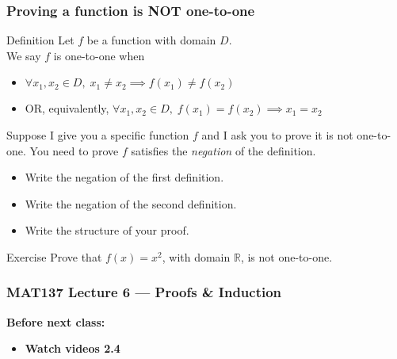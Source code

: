 \documentclass[14pt]{beamer}
\newcommand {\DS} [1] {${\displaystyle #1}$}
\newcommand {\R}{\mathbb{R}}
\newcommand{\p}{\pause}
\begin{document}
\begin{frame}[t]
\fontsize{13}{13}\selectfont
\frametitle{Proving a function is NOT one-to-one}

\begin{block}{Definition}
Let $f$ be a function with domain $D$. \\
We say $f$ is one-to-one when 
	\begin{itemize} 
		\item   \hfill \DS{\forall x_1, x_2 \in D, \; x_1 \neq x_2 \implies  f(x_1) \neq f(x_2)}
		\item    OR, equivalently, \hfill  \DS{\forall x_1, x_2 \in D, \; f(x_1) = f(x_2) \implies x_1 = x_2}
	\end{itemize}
\end{block}

\vfill  \p

Suppose I give you a specific function $f$ and I ask you to prove it is not one-to-one. \pause  You need to prove $f$ satisfies the \emph{negation} of the definition.
	\begin{itemize}
		\item  Write the negation of the first definition.
		\item  Write the negation of the second definition.
		\item  Write the structure of your proof. 
	\end{itemize}
	
\vfill	 \p

\begin{block}{Exercise}
	Prove that $f(x) =  x^2$, with domain $\R$, is not one-to-one.
\end{block}

\end{frame}


\begin{frame}
	\frametitle{MAT137 Lecture 6 --- Proofs \& Induction}

	\vfill
	{\bf Before next class:}
		\begin{itemize} \normalsize
			\item {\bf Watch videos 2.4 }
		\end{itemize}
	\vfill

\end{frame}
\end{document}
